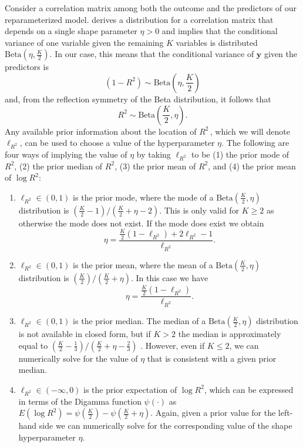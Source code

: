 \documentclass[11pt]{article}
\newcommand{\Rsq}{$R^2\,$}
\newcommand{\y}{\mathbf{y}}
\newcommand{\locRsq}{\ell_{R^2}}
\newcommand{\halfK}{\frac{K}{2}}
\newcommand{\Betadist}[2]{\mathrm{Beta}\left(#1,#2\right)}
\newcommand{\Digamma}[1]{\psi\left(#1\right)}
\begin{document}
Consider a correlation matrix among both the outcome and the predictors of our
reparameterized model.  derives a distribution for a correlation
matrix that depends on a single shape parameter $\eta > 0$ and implies that the
conditional variance of one variable given the remaining $K$ variables is
distributed $\Betadist{\eta}{\halfK}$. In our case, this means that the
conditional variance of $\y$ given the predictors is
$$(1 - R^2) \sim \Betadist{\eta}{\halfK}$$
and, from the reflection symmetry of the Beta distribution, it follows that
$$R^2 \sim \Betadist{\halfK}{\eta}.$$
Any available prior information about the location of \Rsq, which we will denote
$\locRsq$, can be used to choose a value of the hyperparameter $\eta$. The
following are four ways of implying the value of $\eta$ by taking
$\locRsq$ to be (1) the prior mode of $R^2$, (2) the prior median of $R^2$,
(3) the prior mean of $R^2$, and (4) the prior mean of $\log{R^2}$:

\begin{enumerate}
\item $\locRsq \in \left(0,1\right)$ is the prior mode, where the mode of a
$\Betadist{\halfK}{\eta}$ distribution is
$\left(\halfK - 1\right) / \left(\halfK + \eta - 2\right)$.
This is only valid for $K \geq 2$ as otherwise the mode does not exist. If
the mode does exist we obtain
$$\eta = \frac{\halfK \left(1 - \locRsq\right) + 2\locRsq - 1}{\locRsq}.$$

\item $\locRsq \in \left(0,1\right)$ is the prior mean, where the mean of a
$\Betadist{\halfK}{\eta}$ distribution is
$\left(\halfK\right) / \left(\halfK + \eta\right)$. In this case we have
$$\eta = \frac{\halfK \left(1 - \locRsq \right)}{\locRsq}.$$


\item $\locRsq \in \left(0,1\right)$ is the prior median. The median of a
$\Betadist{\halfK}{\eta}$ distribution is not available in closed form, but if
$K > 2$ the median is approximately equal to \newline
$\left(\halfK - \frac{1}{3}\right) / \left(\halfK + \eta - \frac{2}{3}\right)$
\cite{kerman}. However, even if $K \leq 2$, we can numerically solve for the
value of $\eta$ that is consistent with a given prior median.

\item $\locRsq \in \left(-\infty,0\right)$ is the prior expectation of
$\log{R^2}$, which can be expressed in terms of the Digamma function
$\Digamma{\cdot}$ as
$E\left(\log{R^2}\right) = \Digamma{\halfK} - \Digamma{\halfK + \eta}$. Again,
given a prior value for the left-hand side we can numerically solve for the
corresponding value of the shape hyperparameter $\eta$.
\end{enumerate}
\end{document}
